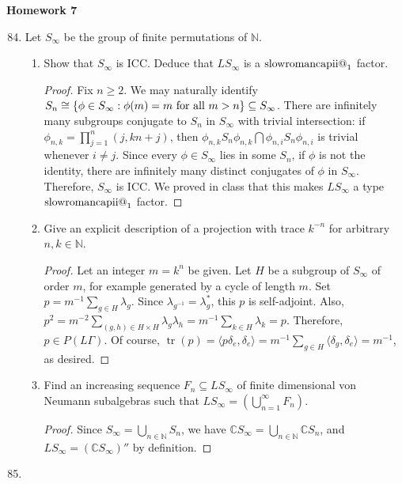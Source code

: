 \documentclass[a4paper,10pt]{report}
\makeatletter
\newcommand{\ggen}[1]{\langle#1\rangle}
\DeclarePairedDelimiter{\set}{\{}{\}}
\newcommand{\N}{\mathbb{N}}
\newcommand{\C}{\mathbb{C}}
\DeclareMathOperator{\tr}{tr}
\newcommand{\Romnum}[1]{\expandafter\@slowromancap\romannumeral #1@}
\newcommand{\factor}[1]{\text{\Romnum{#1}}}
\makeatother
\begin{document}

\pagestyle{fancy}	
\fancyhf{} %
\setlength{\headheight}{60pt}

\begin{center}
	\textbf{Homework 7}
\end{center}

\begin{enumerate}
		\setcounter{enumi}{83}
 \item 
 
 Let $S_{\infty}$ be the group of finite permutations of $\N$.
		\begin{enumerate}
			\item	Show that $S_{\infty}$ is ICC. Deduce that $LS_{\infty}$ is a $\factor{2}_1$ factor.
			\begin{proof}
			Fix $n\ge 2$. We may naturally identify $S_n\cong\set{\phi\in S_{\infty}:\phi(m)=m\text{ for all }m>n}\subseteq S_\infty$. There are infinitely many subgroups conjugate to $S_n$ in $S_\infty$ with trivial intersection: if $\phi_{n,k}=\prod_{j=1}^n(j,kn+j)$, then $\phi_{n,k}S_n\phi_{n,k}\bigcap\phi_{n,i}S_n\phi_{n,i}$ is trivial whenever $i\neq j$. Since every $\phi\in S_\infty$ lies in some $S_n$, if $\phi$ is not the identity, there are infinitely many distinct conjugates of $\phi$ in $S_\infty$. Therefore, $S_\infty$ is ICC. We proved in class that this makes $LS_\infty$ a type $\factor{2}_1$ factor. 
			\end{proof}
			\item	Give an explicit description of a projection with trace $k^{-n}$ for arbitrary $n, k \in \N$.
			\begin{proof}
			Let an integer $m=k^n$ be given. Let $H$ be a subgroup of $S_\infty$ of order $m$, for example generated by a cycle of length $m$. Set $p=m^{-1}\sum_{g\in H}\lambda_g$. Since $\lambda_{g^{-1}}=\lambda_g^*$, this $p$ is self-adjoint. Also, $p^2=m^{-2}\sum_{(g,h)\in H\times H}\lambda_g\lambda_h=m^{-1}\sum_{k\in H}\lambda_k=p$. Therefore, $p\in P(L\Gamma)$. Of course, $\tr(p)=\ggen{p\delta_e,\delta_e}=m^{-1}\sum_{g\in H}\ggen{\delta_g,\delta_e}=m^{-1}$, as desired. 
			\end{proof}
			\item	Find an increasing sequence $F_n \subseteq LS_{\infty}$ of finite dimensional von Neumann subalgebras such that $LS_{\infty} = \left( \bigcup_{n=1}^{\infty}{F_n} \right)$.
			\begin{proof}
			Since $S_\infty=\bigcup_{n\in\N}S_n$, we have $\C S_\infty=\bigcup_{n\in\N}\C S_n$, and $LS_\infty=(\C S_\infty)''$ by definition. 
			\end{proof}
		\end{enumerate}
		\setcounter{enumi}{85}
 \item 
 

\end{enumerate}
\end{document}
